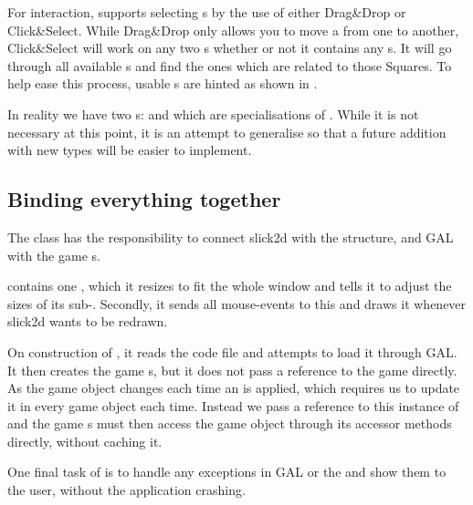 For interaction,  supports selecting s by
the use of either Drag\&Drop or Click\&Select. While Drag\&Drop only allows
you to move a  from one  to another, Click\&Select 
will work on any two s whether or not it contains any
s. It will go through all available s and find
the ones which are related to those Squares. To help ease this process, usable
s are hinted as shown in .

In reality we have two s:  and
 which are specialisations of .
While it is not necessary at this point, it is an attempt to generalise
 so that a future addition with new  types
will be easier to implement.

\subsection{Binding everything together}
\label{sec:connection}

The class  has the responsibility to connect slick2d
with the  structure, and GAL with the game s.

 contains one , which it resizes
to fit the whole window and tells it to adjust the sizes of its
sub-. Secondly, it sends all mouse-events to this
 and draws it whenever slick2d wants to be redrawn.

On construction of , it reads the \productname{} code file
and attempts to load it through GAL. It then creates the game
s, but it does not pass a reference to the game directly. As
the game object changes each time an  is applied, which
requires us to update it in every game object each time. Instead we pass a
reference to this instance of  and the game
s must
then access the game object through its accessor methods directly, without
caching it.

One final task of  is to handle any exceptions in GAL or
the  and show them to the user, without the application
crashing.
